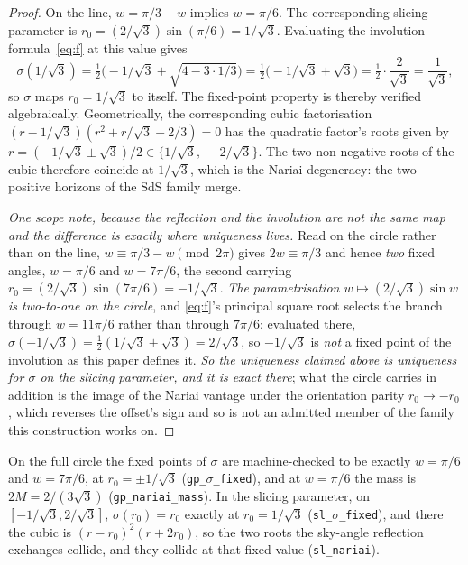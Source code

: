 \documentclass[11pt,a4paper]{article}
\theoremstyle{definition}
\begin{document}
\begin{proof}
On the line, $w=\pi/3-w$ implies $w=\pi/6$. The corresponding slicing parameter is $r_{0}=(2/\sqrt{3})\sin(\pi/6)=1/\sqrt{3}$. Evaluating the involution formula~\eqref{eq:f} at this value gives
\[
\sigma(1/\sqrt{3}) = \tfrac{1}{2}\bigl(-1/\sqrt{3} + \sqrt{4-3\cdot 1/3}\bigr) = \tfrac{1}{2}\bigl(-1/\sqrt{3} + \sqrt{3}\bigr) = \tfrac{1}{2}\cdot\frac{2}{\sqrt{3}} = \frac{1}{\sqrt{3}},
\]
so $\sigma$ maps $r_{0}=1/\sqrt{3}$ to itself. The fixed-point property is thereby verified algebraically. Geometrically, the corresponding cubic factorisation $(r-1/\sqrt{3})(r^{2}+r/\sqrt{3}-2/3)=0$ has the quadratic factor's roots given by $r=(-1/\sqrt{3}\pm\sqrt{3})/2\in\{1/\sqrt{3},\,-2/\sqrt{3}\}$. The two non-negative roots of the cubic therefore coincide at $1/\sqrt{3}$, which is the Nariai degeneracy: the two positive horizons of the SdS family merge.

\emph{One scope note, because the reflection and the involution are not the same map and the difference is exactly where uniqueness lives.} Read on the circle rather than on the line, $w\equiv\pi/3-w \pmod{2\pi}$ gives $2w\equiv\pi/3$ and hence \emph{two} fixed angles, $w=\pi/6$ and $w=7\pi/6$, the second carrying $r_{0}=(2/\sqrt3)\sin(7\pi/6)=-1/\sqrt3$. \emph{The parametrisation $w\mapsto(2/\sqrt3)\sin w$ is two-to-one on the circle}, and \eqref{eq:f}'s principal square root selects the branch through $w=11\pi/6$ rather than through $7\pi/6$: evaluated there, $\sigma(-1/\sqrt3)=\tfrac12(1/\sqrt3+\sqrt3)=2/\sqrt3$, so $-1/\sqrt3$ is \emph{not} a fixed point of the involution as this paper defines it. \emph{So the uniqueness claimed above is uniqueness for $\sigma$ on the slicing parameter, and it is exact there}; what the circle carries in addition is the image of the Nariai vantage under the orientation parity $r_{0}\to-r_{0}$, which reverses the offset's sign and so is not an admitted member of the family this construction works on.
\end{proof}

On the full circle the fixed points of $\sigma$ are machine-checked to be exactly $w=\pi/6$ and $w=7\pi/6$, at $r_{0}=\pm1/\sqrt3$ (\texttt{gp\_$\sigma$\_fixed}), and at $w=\pi/6$ the mass is $2M=2/(3\sqrt3)$ (\texttt{gp\_nariai\_mass}). In the slicing parameter, on $[-1/\sqrt3,2/\sqrt3]$, $\sigma(r_{0})=r_{0}$ exactly at $r_{0}=1/\sqrt3$ (\texttt{sl\_$\sigma$\_fixed}), and there the cubic is $(r-r_{0})^{2}(r+2r_{0})$, so the two roots the sky-angle reflection exchanges collide, and they collide at that fixed value (\texttt{sl\_nariai}).
\end{document}
